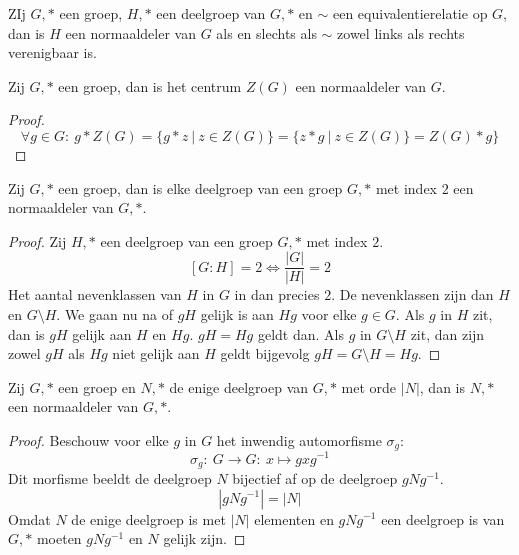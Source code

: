 \documentclass[main.tex]{subfiles}
\begin{document}
\begin{st}
  ZIj $G,*$ een groep, $H,*$ een deelgroep van $G,*$ en $\sim$ een equivalentierelatie op $G$, dan is $H$ een normaaldeler van $G$ als en slechts als $\sim$ zowel links als rechts verenigbaar is.

\end{st}

\begin{pr}
  Zij $G,*$ een groep, dan is het centrum $Z(G)$ een normaaldeler van $G$.
  \begin{proof}
    \[ \forall g\in G:\ g*Z(G) = \{ g*z \ |\ z\in Z(G) \} = \{ z*g \ |\ z\in Z(G) \} = Z(G)*g \} \]
  \end{proof}
\end{pr}

\begin{pr}
  Zij $G,*$ een groep, dan is elke deelgroep van een groep $G,*$ met index $2$ een normaaldeler van $G,*$.
  \begin{proof}
    Zij $H,*$ een deelgroep van een groep $G,*$ met index $2$.
    \[ [G:H] = 2 \Leftrightarrow \frac{|G|}{|H|} = 2 \]
    Het aantal nevenklassen van $H$ in $G$ in dan precies $2$.
    De nevenklassen zijn dan $H$ en $G\setminus H$.
    We gaan nu na of $gH$ gelijk is aan $Hg$ voor elke $g\in G$.
    Als $g$ in $H$ zit, dan is $gH$ gelijk aan $H$ en $Hg$. $gH=Hg$ geldt dan.
    Als $g$ in $G\setminus H$ zit, dan zijn zowel $gH$ als $Hg$ niet gelijk aan $H$ geldt bijgevolg $gH = G\setminus H = Hg$.
  \end{proof}
\end{pr}

\begin{pr}
  Zij $G,*$ een groep en $N,*$ de enige deelgroep van $G,*$ met orde $|N|$, dan is $N,*$ een normaaldeler van $G,*$.

  \begin{proof}
    Beschouw voor elke $g$ in $G$ het inwendig automorfisme $\sigma_{g}$:
    \[ \sigma_{g}:\ G \rightarrow G:\ x \mapsto gxg^{-1} \]
    Dit morfisme beeldt de deelgroep $N$ bijectief af op de deelgroep $gNg^{-1}$.
    \[ |gNg^{-1}| = |N| \]
    Omdat $N$ de enige deelgroep is met $|N|$ elementen en $gNg^{-1}$ een deelgroep is \waarom van $G,*$ moeten $gNg^{-1}$ en $N$ gelijk zijn.
  \end{proof}
\end{pr}
\end{document}
